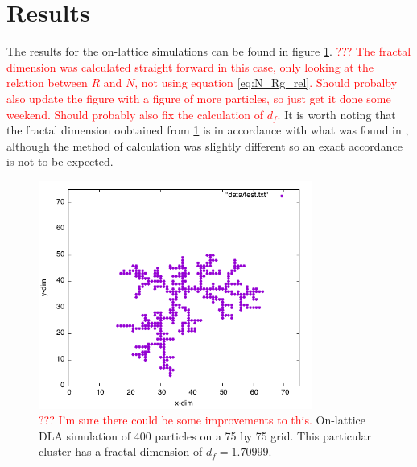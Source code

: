 \section{Results}
The results for the on-lattice simulations can be found in figure \ref{fig:2d-DLA_400}. \textcolor{red}{??? The fractal dimension was calculated straight forward in this case, only looking at the relation between $R$ and $N$, not using equation \eqref{eq:N_Rg_rel}. Should probalby also update the figure with a figure of more particles, so just get it done some weekend. Should probably also fix the calculation of $d_f$.} It is worth noting that the fractal dimension oobtained from \ref{fig:2d-DLA_400} is in accordance with what was found in \cite{PhysRevLett.47.1400}, although the method of calculation was slightly different so an exact accordance is not to be expected. 

\begin{figure}[h]
	\begin{center}
		\includegraphics[width = 0.8\textwidth]{fig/on_lattice_400_p_75_g.png}
		\caption{\textcolor{red}{??? I'm sure there could be some improvements to this.} On-lattice DLA simulation of 400 particles on a 75 by 75 grid.  This particular cluster has a fractal dimension of $d_f = 1.70999$.}
		\label{fig:2d-DLA_400}
	\end{center}
\end{figure}

